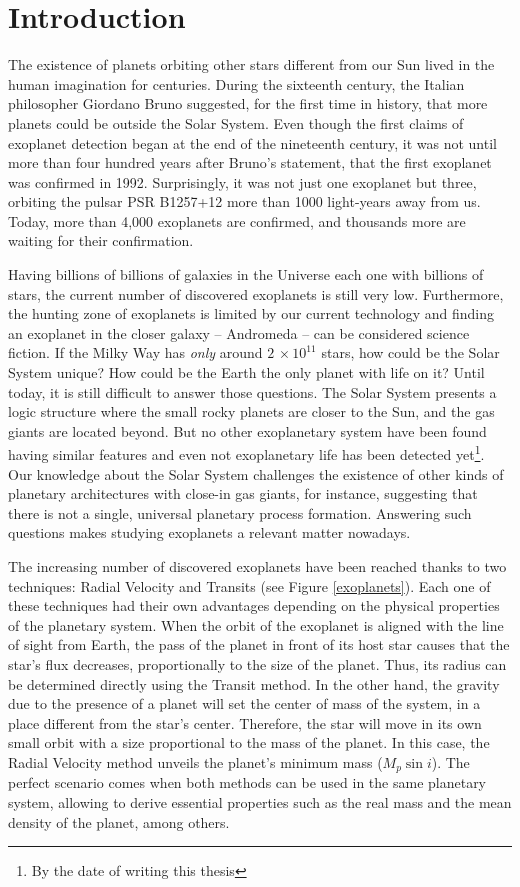 \chapter{Introduction}\label{chap:intro}
The existence of planets orbiting other stars different from our Sun lived in the human imagination for centuries. During the sixteenth century, the Italian philosopher Giordano Bruno suggested, for the first time in history, that more planets could be outside the Solar System. Even though the first claims of exoplanet detection began at the end of the nineteenth century, it was not until more than four hundred years after Bruno's statement, that the first exoplanet was confirmed in 1992. Surprisingly, it was not just one exoplanet but three, orbiting the pulsar PSR B1257+12 more than 1000 light-years away from us. Today, more than 4,000 exoplanets are confirmed, and thousands more are waiting for their confirmation.

Having billions of billions of galaxies in the Universe each one with billions of stars, the current number of discovered exoplanets is still very low. Furthermore, the hunting zone of exoplanets is limited by our current technology and finding an exoplanet in the closer galaxy -- Andromeda -- can be considered science fiction. If the Milky Way has \textit{only} around $2\,\times10^{11}$ stars, how could be the Solar System unique? How could be the Earth the only planet with life on it? Until today, it is still difficult to answer those questions. The Solar System presents a logic structure where the small rocky planets are closer to the Sun, and the gas giants are located beyond. But no other exoplanetary system have been found having similar features and even not exoplanetary life has been detected yet\footnote{By the date of writing this thesis}. Our knowledge about the Solar System challenges the existence of other kinds of planetary architectures with close-in gas giants, for instance, suggesting that there is not a single, universal planetary process formation. Answering such questions makes studying exoplanets a relevant matter nowadays.

The increasing number of discovered exoplanets have been reached thanks to two techniques: Radial Velocity and Transits (see Figure \ref{exoplanets}). Each one of these techniques had their own advantages depending on the physical properties of the planetary system. When the orbit of the exoplanet is aligned with the line of sight from Earth, the pass of the planet in front of its host star causes that the star's flux decreases, proportionally to the size of the planet. Thus, its radius can be determined directly using the Transit method. In the other hand, the gravity due to the presence of a planet will set the center of mass of the system, in a place different from the star's center. Therefore, the star will move in its own small orbit with a size proportional to the mass of the planet. In this case, the Radial Velocity method unveils the planet's minimum mass ($M_{p}\sin i$). The perfect scenario comes when both methods can be used in the same planetary system, allowing to derive essential properties such as the real mass and the mean density of the planet, among others.

